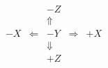 \documentclass{article}
\begin{document}
\pagecolor{green!20}
\huge \bf
\[
\begin{array}{ccccc}
  && -Z && \\
  &&\Uparrow && \\
-X & \Leftarrow & -Y & \Rightarrow & +X \\
  &&\Downarrow && \\
&& +Z && 
\end{array}
\]
\end{document}
